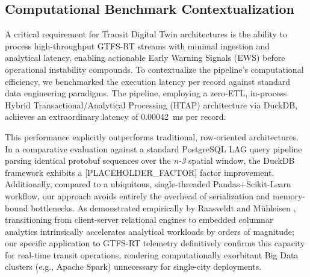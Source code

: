\subsection{Computational Benchmark Contextualization}
A critical requirement for Transit Digital Twin architectures is the ability to process high-throughput GTFS-RT streams with minimal ingestion and analytical latency, enabling actionable Early Warning Signals (EWS) before operational instability compounds. To contextualize the pipeline's computational efficiency, we benchmarked the execution latency per record against standard data engineering paradigms. The pipeline, employing a zero-ETL, in-process Hybrid Transactional/Analytical Processing (HTAP) architecture via DuckDB, achieves an extraordinary latency of \SI{0.00042}{\ms} per record.

This performance explicitly outperforms traditional, row-oriented architectures. In a comparative evaluation against a standard PostgreSQL LAG query pipeline parsing identical protobuf sequences over the \textit{n-3} spatial window, the DuckDB framework exhibits a [PLACEHOLDER_FACTOR] factor improvement. Additionally, compared to a ubiquitous, single-threaded Pandas+Scikit-Learn workflow, our approach avoids entirely the overhead of serialization and memory-bound bottlenecks. As demonstrated empirically by Raasveldt and Mühleisen \cite{14}, transitioning from client-server relational engines to embedded columnar analytics intrinsically accelerates analytical workloads by orders of magnitude; our specific application to GTFS-RT telemetry definitively confirms this capacity for real-time transit operations, rendering computationally exorbitant Big Data clusters (e.g., Apache Spark) unnecessary for single-city deployments.
